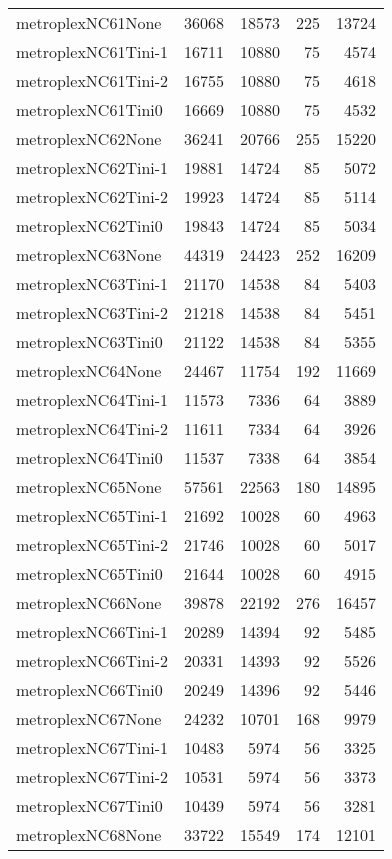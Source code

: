 \begin{longtable}{lrrrr}
metroplexNC61None & 36068 & 18573 & 225 & 13724 \\
metroplexNC61Tini-1 & 16711 & 10880 & 75 & 4574 \\
metroplexNC61Tini-2 & 16755 & 10880 & 75 & 4618 \\
metroplexNC61Tini0 & 16669 & 10880 & 75 & 4532 \\
metroplexNC62None & 36241 & 20766 & 255 & 15220 \\
metroplexNC62Tini-1 & 19881 & 14724 & 85 & 5072 \\
metroplexNC62Tini-2 & 19923 & 14724 & 85 & 5114 \\
metroplexNC62Tini0 & 19843 & 14724 & 85 & 5034 \\
metroplexNC63None & 44319 & 24423 & 252 & 16209 \\
metroplexNC63Tini-1 & 21170 & 14538 & 84 & 5403 \\
metroplexNC63Tini-2 & 21218 & 14538 & 84 & 5451 \\
metroplexNC63Tini0 & 21122 & 14538 & 84 & 5355 \\
metroplexNC64None & 24467 & 11754 & 192 & 11669 \\
metroplexNC64Tini-1 & 11573 & 7336 & 64 & 3889 \\
metroplexNC64Tini-2 & 11611 & 7334 & 64 & 3926 \\
metroplexNC64Tini0 & 11537 & 7338 & 64 & 3854 \\
metroplexNC65None & 57561 & 22563 & 180 & 14895 \\
metroplexNC65Tini-1 & 21692 & 10028 & 60 & 4963 \\
metroplexNC65Tini-2 & 21746 & 10028 & 60 & 5017 \\
metroplexNC65Tini0 & 21644 & 10028 & 60 & 4915 \\
metroplexNC66None & 39878 & 22192 & 276 & 16457 \\
metroplexNC66Tini-1 & 20289 & 14394 & 92 & 5485 \\
metroplexNC66Tini-2 & 20331 & 14393 & 92 & 5526 \\
metroplexNC66Tini0 & 20249 & 14396 & 92 & 5446 \\
metroplexNC67None & 24232 & 10701 & 168 & 9979 \\
metroplexNC67Tini-1 & 10483 & 5974 & 56 & 3325 \\
metroplexNC67Tini-2 & 10531 & 5974 & 56 & 3373 \\
metroplexNC67Tini0 & 10439 & 5974 & 56 & 3281 \\
metroplexNC68None & 33722 & 15549 & 174 & 12101 \\

\end{longtable}
